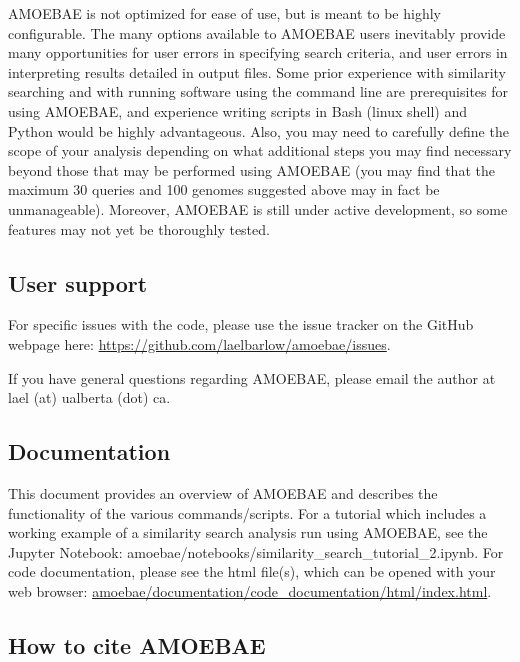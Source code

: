 \documentclass[12pt,letterpaper]{article}
\begin{document}
\begin{linenumbers}
AMOEBAE is not optimized for ease of use, but is meant to be highly
configurable. The many options available to AMOEBAE users inevitably provide
many opportunities for user errors in specifying search criteria, and user errors in
interpreting results detailed in output files. Some prior experience with
similarity searching and with running software using the command line are
prerequisites for using AMOEBAE, and experience writing scripts in Bash (linux
shell) and Python would be highly advantageous. Also, you may need to
carefully define the scope of your analysis depending on what additional steps
you may find necessary beyond those that may be performed using AMOEBAE (you
may find that the maximum 30 queries and 100 genomes suggested above may in
fact be unmanageable). Moreover, AMOEBAE is still under active development, so
some features may not yet be thoroughly tested.



\subsection{User support}

For specific issues with the code, please use the issue tracker on the GitHub
    webpage here: \url{https://github.com/laelbarlow/amoebae/issues}. 

If you have general questions regarding AMOEBAE, please email the author at
    lael (at) ualberta (dot) ca.

\subsection{Documentation}

This document provides an overview of AMOEBAE and describes the functionality
of the various commands/scripts. For a tutorial which includes a working
example of a similarity search analysis run using AMOEBAE, see the Jupyter
Notebook: amoebae/notebooks/similarity\_search\_tutorial\_2.ipynb. For code
documentation, please see the html file(s), which can be opened with your web
browser: \url{amoebae/documentation/code_documentation/html/index.html}.


\subsection{How to cite AMOEBAE}


\end{linenumbers}
\end{document}
